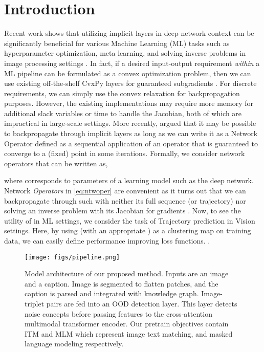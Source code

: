 \documentclass{article}
\begin{document}
\section{Introduction}
Recent work shows that utilizing implicit layers  in deep network context can be significantly  beneficial for various Machine Learning (ML) tasks such as hyperparameter optimization, meta learning, and solving inverse problems in image processing settings \cite{blondel2021efficient, gilton2021deep,huang2021textrm}. In fact, if a desired input-output requirement {\em within} a ML pipeline can be formulated as a convex optimization problem, then we can use existing off-the-shelf CvxPy layers for guaranteed subgradients \cite{agrawal2019differentiable}. For discrete requirements, we can simply use the convex relaxation for backpropagation purposes. However, the existing implementations may require more memory for additional slack variables or time to handle the Jacobian, both of which are impractical in large-scale settings.  More recently, \cite{fung2022jfb} argued  that it may be possible to backpropagate through implicit layers as long as we can write it as a  Network Operator  defined as a sequential application of an operator  that is guaranteed to  converge to a (fixed) point in some  iterations. Formally, we consider network operators  that can be written as,

where  corresponds to parameters of a learning model such as the deep network. Network {\em Operators} in \eqref{eq:ntwoper} are convenient as it turns out that we can backpropagate through such  with neither its full sequence (or trajectory) nor solving an inverse problem with its Jacobian for gradients \cite{fung2022jfb}. Now, to see the utility of  in  ML settings,  we consider the task of Trajectory prediction in Vision settings. Here, by using  (with an appropriate ) as a  clustering map on training data, we can easily define performance improving loss functions. \cite{sun2021three}.    \begin{figure*}[!t]
\texttt{[image: figs/pipeline.png]}
\centering
\caption{\label{fig:model}Model architecture of our proposed method. Inputs are an image and a caption. Image is segmented to flatten patches, and the caption is parsed and integrated with knowledge graph. Image-triplet pairs are fed into an OOD detection layer. This layer detects noise concepts before passing features to the cross-attention multimodal transformer encoder. Our pretrain objectives contain ITM and MLM which represent image text matching, and masked language modeling respectively.}
\end{figure*}
\setlength{\dbltextfloatsep}{5pt}
\end{document}
